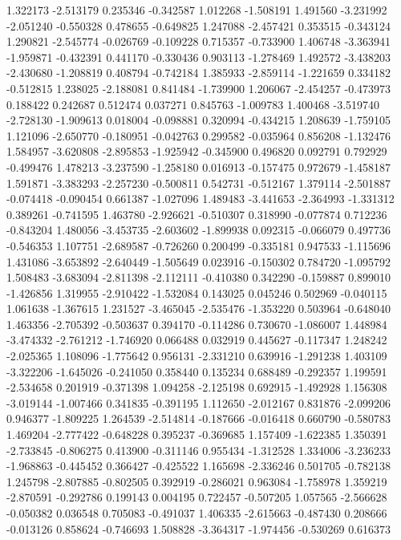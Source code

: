 1.322173
-2.513179
0.235346
-0.342587
1.012268
-1.508191
1.491560
-3.231992
-2.051240
-0.550328
0.478655
-0.649825
1.247088
-2.457421
0.353515
-0.343124
1.290821
-2.545774
-0.026769
-0.109228
0.715357
-0.733900
1.406748
-3.363941
-1.959871
-0.432391
0.441170
-0.330436
0.903113
-1.278469
1.492572
-3.438203
-2.430680
-1.208819
0.408794
-0.742184
1.385933
-2.859114
-1.221659
0.334182
-0.512815
1.238025
-2.188081
0.841484
-1.739900
1.206067
-2.454257
-0.473973
0.188422
0.242687
0.512474
0.037271
0.845763
-1.009783
1.400468
-3.519740
-2.728130
-1.909613
0.018004
-0.098881
0.320994
-0.434215
1.208639
-1.759105
1.121096
-2.650770
-0.180951
-0.042763
0.299582
-0.035964
0.856208
-1.132476
1.584957
-3.620808
-2.895853
-1.925942
-0.345900
0.496820
0.092791
0.792929
-0.499476
1.478213
-3.237590
-1.258180
0.016913
-0.157475
0.972679
-1.458187
1.591871
-3.383293
-2.257230
-0.500811
0.542731
-0.512167
1.379114
-2.501887
-0.074418
-0.090454
0.661387
-1.027096
1.489483
-3.441653
-2.364993
-1.331312
0.389261
-0.741595
1.463780
-2.926621
-0.510307
0.318990
-0.077874
0.712236
-0.843204
1.480056
-3.453735
-2.603602
-1.899938
0.092315
-0.066079
0.497736
-0.546353
1.107751
-2.689587
-0.726260
0.200499
-0.335181
0.947533
-1.115696
1.431086
-3.653892
-2.640449
-1.505649
0.023916
-0.150302
0.784720
-1.095792
1.508483
-3.683094
-2.811398
-2.112111
-0.410380
0.342290
-0.159887
0.899010
-1.426856
1.319955
-2.910422
-1.532084
0.143025
0.045246
0.502969
-0.040115
1.061638
-1.367615
1.231527
-3.465045
-2.535476
-1.353220
0.503964
-0.648040
1.463356
-2.705392
-0.503637
0.394170
-0.114286
0.730670
-1.086007
1.448984
-3.474332
-2.761212
-1.746920
0.066488
0.032919
0.445627
-0.117347
1.248242
-2.025365
1.108096
-1.775642
0.956131
-2.331210
0.639916
-1.291238
1.403109
-3.322206
-1.645026
-0.241050
0.358440
0.135234
0.688489
-0.292357
1.199591
-2.534658
0.201919
-0.371398
1.094258
-2.125198
0.692915
-1.492928
1.156308
-3.019144
-1.007466
0.341835
-0.391195
1.112650
-2.012167
0.831876
-2.099206
0.946377
-1.809225
1.264539
-2.514814
-0.187666
-0.016418
0.660790
-0.580783
1.469204
-2.777422
-0.648228
0.395237
-0.369685
1.157409
-1.622385
1.350391
-2.733845
-0.806275
0.413900
-0.311146
0.955434
-1.312528
1.334006
-3.236233
-1.968863
-0.445452
0.366427
-0.425522
1.165698
-2.336246
0.501705
-0.782138
1.245798
-2.807885
-0.802505
0.392919
-0.286021
0.963084
-1.758978
1.359219
-2.870591
-0.292786
0.199143
0.004195
0.722457
-0.507205
1.057565
-2.566628
-0.050382
0.036548
0.705083
-0.491037
1.406335
-2.615663
-0.487430
0.208666
-0.013126
0.858624
-0.746693
1.508828
-3.364317
-1.974456
-0.530269
0.616373
